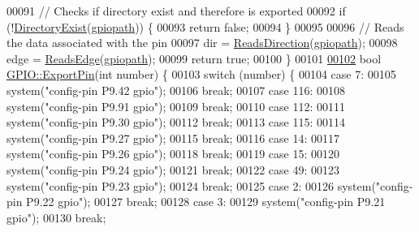 \begin{DoxyCode}
00091   \textcolor{comment}{// Checks if directory exist and therefore is exported}
00092   \textcolor{keywordflow}{if} (!\hyperlink{class_hardware_1_1_b_b_b_adf431d8e0e8899f7aa16c350a2270e79}{DirectoryExist}(\hyperlink{class_hardware_1_1_g_p_i_o_ac47062ed6aba52b9e8506e1575bf5061}{gpiopath})) \{
00093     \textcolor{keywordflow}{return} \textcolor{keyword}{false};
00094   \}
00095 
00096   \textcolor{comment}{// Reads the data associated with the pin}
00097   dir = \hyperlink{class_hardware_1_1_g_p_i_o_a875d4f95ff3e6a70196660faa0477cf5}{ReadsDirection}(\hyperlink{class_hardware_1_1_g_p_i_o_ac47062ed6aba52b9e8506e1575bf5061}{gpiopath});
00098   edge = \hyperlink{class_hardware_1_1_g_p_i_o_ac5a3c6d1a0ce58a0b2ee0752623810e4}{ReadsEdge}(\hyperlink{class_hardware_1_1_g_p_i_o_ac47062ed6aba52b9e8506e1575bf5061}{gpiopath});
00099   \textcolor{keywordflow}{return} \textcolor{keyword}{true};
00100 \}
00101 
\hypertarget{_g_p_i_o_8cpp_source_l00102}{}\hyperlink{class_hardware_1_1_g_p_i_o_a1a880bee633c9c5227cb36d2d6c63a52}{00102} \textcolor{keywordtype}{bool} \hyperlink{class_hardware_1_1_g_p_i_o_a1a880bee633c9c5227cb36d2d6c63a52}{GPIO::ExportPin}(\textcolor{keywordtype}{int} number) \{
00103   \textcolor{keywordflow}{switch} (number) \{
00104   \textcolor{keywordflow}{case} 7:
00105     system(\textcolor{stringliteral}{"config-pin P9.42 gpio"});
00106     \textcolor{keywordflow}{break};
00107   \textcolor{keywordflow}{case} 116:
00108     system(\textcolor{stringliteral}{"config-pin P9.91 gpio"});
00109     \textcolor{keywordflow}{break};
00110   \textcolor{keywordflow}{case} 112:
00111     system(\textcolor{stringliteral}{"config-pin P9.30 gpio"});
00112     \textcolor{keywordflow}{break};
00113   \textcolor{keywordflow}{case} 115:
00114     system(\textcolor{stringliteral}{"config-pin P9.27 gpio"});
00115     \textcolor{keywordflow}{break};
00116   \textcolor{keywordflow}{case} 14:
00117     system(\textcolor{stringliteral}{"config-pin P9.26 gpio"});
00118     \textcolor{keywordflow}{break};
00119   \textcolor{keywordflow}{case} 15:
00120     system(\textcolor{stringliteral}{"config-pin P9.24 gpio"});
00121     \textcolor{keywordflow}{break};
00122   \textcolor{keywordflow}{case} 49:
00123     system(\textcolor{stringliteral}{"config-pin P9.23 gpio"});
00124     \textcolor{keywordflow}{break};
00125   \textcolor{keywordflow}{case} 2:
00126     system(\textcolor{stringliteral}{"config-pin P9.22 gpio"});
00127     \textcolor{keywordflow}{break};
00128   \textcolor{keywordflow}{case} 3:
00129     system(\textcolor{stringliteral}{"config-pin P9.21 gpio"});
00130     \textcolor{keywordflow}{break};

\end{DoxyCode}
